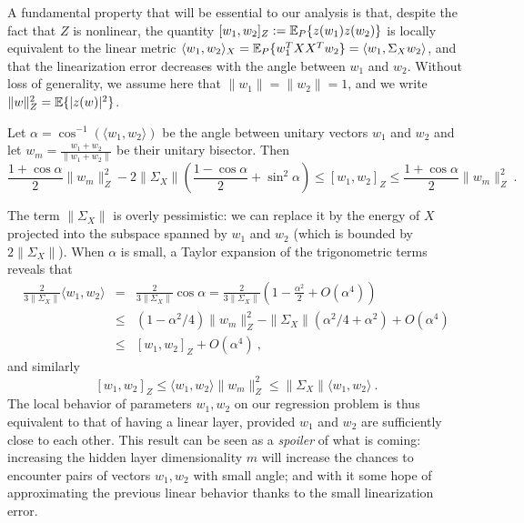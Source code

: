  A fundamental property that will be essential to our analysis is that, despite 
the fact that $Z$ is nonlinear, the quantity $[ w_1, w_2 ]_Z := {\mathbb{E}}_P \{ z(w_1) z(w_2) \} $ 
is locally equivalent to the linear metric $\langle w_1, w_2 \rangle_X = {\mathbb{E}}_P \{ w_1^T X X^T w_2 \} = \langle w_1, \Sigma_X w_2 \rangle$, and that the linearization error decreases with the angle between $w_1$ and $w_2$. Without loss of generality, we assume here that $\|w_1 \| = \| w_2 \| = 1$, and we write $\| w \|_Z^2 = {\mathbb{E}} \{ | z(w) |^2 \} $.
\begin{proposition}
\label{localdistprop}
Let $\alpha = \cos^{-1}( \langle w_1, w_2 \rangle )$ be the angle between unitary vectors $w_1$ and $w_2$ and let $w_m =  \frac{w_1 + w_2}{\| w_1 + w_2 \|}$ be their unitary bisector. 
Then
\begin{equation}
\label{localdisteq}
 \frac{1 + \cos \alpha}{2}  \| w_m  \|_Z^2 - 2 \| \Sigma_X \| \left( \frac{1-\cos \alpha}{2} + \sin^2 \alpha \right) \leq [ w_1, w_2 ]_Z \leq \frac{1+\cos \alpha}{2}  \| w_m  \|_Z^2 ~.
\end{equation}
\end{proposition} 
The term $\| \Sigma_X \| $ is overly pessimistic: we can replace it by the energy of $X$ projected into the subspace spanned by $w_1$ and $w_2$ (which is bounded by $2 \| \Sigma_X \|$). 
When $\alpha$ is small, a Taylor expansion of the trigonometric terms reveals that 
\begin{eqnarray*}
\frac{2}{3 \| \Sigma_X \|} \langle w_1, w_2 \rangle &=& \frac{2}{3 \| \Sigma_X \|} \cos \alpha = \frac{2}{3\| \Sigma_X \|}(1 - \frac{\alpha^2}{2} + O(\alpha^4)) \\ 
&\leq& ( 1 - \alpha^2/4)\| w_m \|_Z^2 - \| \Sigma_X \|( \alpha^2/4 + \alpha^2) + O(\alpha^4) \\
&\leq & [ w_1, w_2 ]_Z + O(\alpha^4) ~,
\end{eqnarray*}
and similarly 
$$[ w_1, w_2 ]_Z \leq \langle w_1, w_2 \rangle \| w_m \|_Z^2 \leq \| \Sigma_X\| \langle w_1, w_2 \rangle~.$$
The local behavior of parameters $w_1, w_2$ on our regression problem is thus equivalent to that of having a linear layer, provided $w_1$ and $w_2$ are sufficiently close to each other.
This result can be seen as a \emph{spoiler} of what is coming: increasing the hidden layer dimensionality $m$ will increase the chances to encounter pairs of vectors $w_1, w_2$ with small angle; and with it some hope of approximating the previous linear behavior thanks to the small linearization error. 

